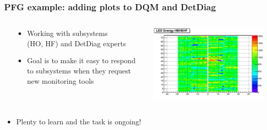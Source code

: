 \documentclass[bigger]{beamer}
\begin{document}
\begin{frame}
\frametitle{PFG example: adding plots to DQM and DetDiag}
\label{sec-1-1-4}
\begin{columns} %
\label{sec-1-1-4-1}
\begin{column}{0.6\textwidth}
\label{sec-1-1-4-1-1}
\begin{itemize}

\item Working with subsystems\\
\label{sec-1-1-4-1-1-1}%
(HO, HF) and DetDiag experts

\item Goal is to make it easy to respond to subsystems when they request new monitoring tools
\label{sec-1-1-4-1-1-2}%
\end{itemize} %
\end{column}
\begin{column}{0.50\textwidth}
\label{sec-1-1-4-1-2}

\centering
\includegraphics[width=.9\linewidth]{fig/led_energy_hbhehf.png}
\end{column}
\end{columns}
\begin{itemize}

\item Plenty to learn and the task is ongoing!
\label{sec-1-1-4-2}%
\end{itemize} %
\end{frame}
\end{document}
